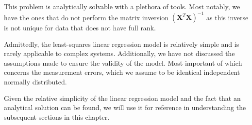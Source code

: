  \noindent This problem is analytically solvable with a plethora of tools. Most notably, we have the ones that do not perform the matrix inversion $(\mathbf{X}^T \mathbf{X})^{-1}$ as this inverse is not unique for data that does not have full rank.

Admittedly, the least-squares linear regression model is relatively simple and is rarely applicable to complex systems. Additionally, we have not discussed the assumptions made to ensure the validity of the model. Most important of which concerns the measurement errors, which we assume to be identical independent normally distributed.

Given the relative simplicity of the linear regression model and the fact that an analytical solution can be found, we will use it for reference in understanding the subsequent sections in this chapter.


